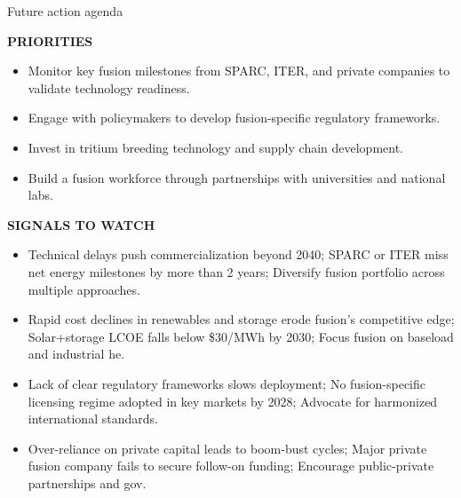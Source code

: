 \documentclass[10pt,a4paper]{article}
\begin{document}
\clearpage
{\sffamily\fontsize{21}{26}\selectfont\color{BONavy} Future action agenda}\par\vspace{7pt}
\begin{minipage}[t]{0.47\linewidth}
{\textcolor{BOGreen}{\scriptsize\bfseries PRIORITIES}}\par\vspace{3pt}
{\small\begin{itemize}
\item Monitor key fusion milestones from SPARC, ITER, and private companies to validate technology readiness.
\item Engage with policymakers to develop fusion-specific regulatory frameworks.
\item Invest in tritium breeding technology and supply chain development.
\item Build a fusion workforce through partnerships with universities and national labs.
\end{itemize}}
\end{minipage}\hfill\begin{minipage}[t]{0.45\linewidth}
{\textcolor{BOGreen}{\scriptsize\bfseries SIGNALS TO WATCH}}\par\vspace{3pt}
{\small\begin{itemize}
\item Technical delays push commercialization beyond 2040; SPARC or ITER miss net energy milestones by more than 2 years; Diversify fusion portfolio across multiple approaches.
\item Rapid cost declines in renewables and storage erode fusion's competitive edge; Solar+storage LCOE falls below \$30/MWh by 2030; Focus fusion on baseload and industrial he.
\item Lack of clear regulatory frameworks slows deployment; No fusion-specific licensing regime adopted in key markets by 2028; Advocate for harmonized international standards.
\item Over-reliance on private capital leads to boom-bust cycles; Major private fusion company fails to secure follow-on funding; Encourage public-private partnerships and gov.
\end{itemize}}
\end{minipage}
\end{document}
